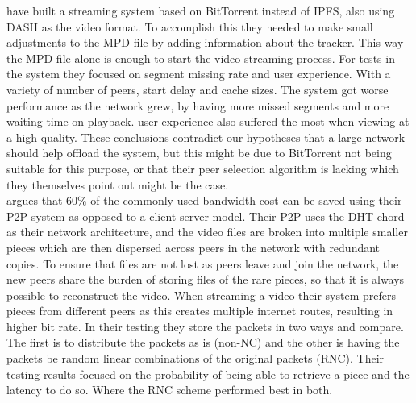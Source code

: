 \citeauthor{gazdar2017toward} \cite{gazdar2017toward} have built a streaming system based on BitTorrent instead of \ac{IPFS}, also using \ac{DASH} as the video format. To accomplish this they needed to make small adjustments to the \ac{MPD} file by adding information about the tracker. This way the \ac{MPD} file alone is enough to start the video streaming process. For tests in the system they focused on segment missing rate and user experience. With a variety of number of peers, start delay and cache sizes. The system got worse performance as the network grew, by having more missed segments and more waiting time on playback. user experience also suffered the most when viewing at a high quality. These conclusions contradict our hypotheses that a large network should help offload the system, but this might be due to BitTorrent not being suitable for this purpose, or that their peer selection algorithm is lacking which they themselves point out might be the case.
\\


\citeauthor{nguyen2009p2p} \cite{nguyen2009p2p} argues that 60\% of the commonly used bandwidth cost can be saved using their \ac{P2P} system as opposed to a client-server model. Their \ac{P2P} uses the \ac{DHT} chord as their network architecture, and the video files are broken into multiple smaller pieces which are then dispersed across peers in the network with redundant copies. To ensure that files are not lost as peers leave and join the network, the new peers share the burden of storing files of the rare pieces, so that it is always possible to reconstruct the video. When streaming a video their system prefers pieces from different peers as this creates multiple internet routes, resulting in higher bit rate. In their testing they store the packets in two ways and compare. The first is to distribute the packets as is (non-\ac{NC}) and the other is having the packets be random linear combinations of the original packets (\ac{RNC}). Their testing results focused on the probability of being able to retrieve a piece and the latency to do so. Where the \ac{RNC} scheme performed best in both.
\\


